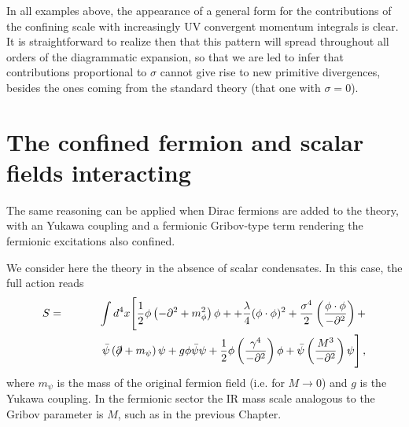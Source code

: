 In all  examples above, the appearance of a general form for the contributions of the confining
scale with increasingly UV convergent momentum integrals is clear.
It is straightforward to realize then that this pattern will spread throughout all orders of
the diagrammatic expansion, so that we are led to infer that  contributions proportional to
$\sigma$  cannot give rise to new primitive divergences, besides the ones coming from the
standard theory (that one with $\sigma =0$). 



\section{The confined fermion and scalar fields interacting}
\label{confscalarferm}

The same reasoning can be applied when Dirac fermions are added to the theory, with an Yukawa
coupling and a fermionic Gribov-type term rendering the fermionic excitations also confined.  

We consider here the theory in the absence of scalar condensates. In this case, the full action
reads 
\begin{eqnarray} 
S &=& \int d^4 x \Biggl[ \frac 12  {\phi}\left(  -\partial^{2} +  m_{\phi}^2 \right){\phi} + 
 + \frac{\lambda}{4}  ({\phi}\cdot {\phi})^{2} + 
\frac{\sigma^4}{2}  \left(  \frac{{\phi}\cdot{\phi}}{-\partial^2}\right)  +
\nonumber \\
&&
\phantom{\int d^4 x }
\bar{\psi} \left(\partial\!\!\!/ + m_{\psi}\right) \psi + g\phi\bar{\psi} \psi + \frac 12 \phi \left(  \frac{\gamma^4}{-\partial^2}\right)
\phi  + \bar{\psi}\left(\frac{M^3}{-\partial^2}\right)\psi \Biggr]\,,
\label{scalarferm}
\end{eqnarray}
where $m_{\psi}$ is the mass of the original fermion field (i.e. for $M\to 0$) and $g$ is the
Yukawa coupling. In the fermionic sector the IR mass scale analogous to the Gribov parameter is
$M$, such as in the previous Chapter. 

